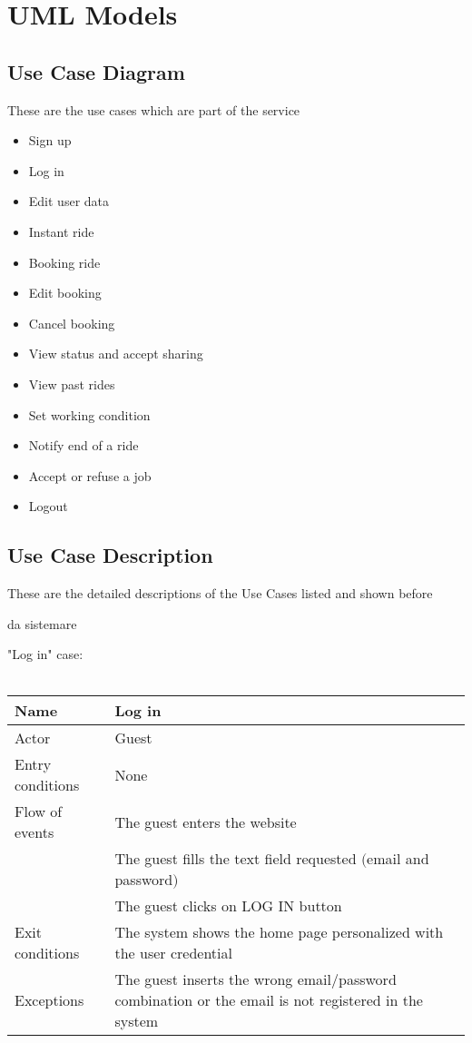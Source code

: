 \section{UML Models}

\subsection{Use Case Diagram}
These are the use cases which are part of the service
\begin{itemize}
	\item Sign up
	\item Log in
	\item Edit user data
	\item Instant ride
	\item Booking ride
	\item Edit booking
	\item Cancel booking
	\item View status and accept sharing
	\item View past rides
	\item Set working condition
	\item Notify end of a ride
	\item Accept or refuse a job
	\item Logout
	
	
	
\end{itemize}
\subsection{Use Case Description}
These are the detailed descriptions of the Use Cases listed and shown before
\begin{Huge} da sistemare 
\end{Huge}


\newpage
"Log in" case:
\\
\\
\begin{tabular}{|l|p{10cm}|} 
\hline
Name & Log in\\
\hline
Actor & Guest\\
\hline
Entry conditions & None\\
\hline
Flow of events
			&	\tabitem The guest enters the website\\
			&	\tabitem The guest fills the text field requested $($email and password$)$\\
			&	\tabitem The guest clicks on LOG IN button\\
\hline
Exit conditions & The system shows the home page personalized with the user credential\\
\hline
Exceptions & The guest inserts the wrong email/password combination or the email is not registered in the system\\
\hline
\end {tabular}


